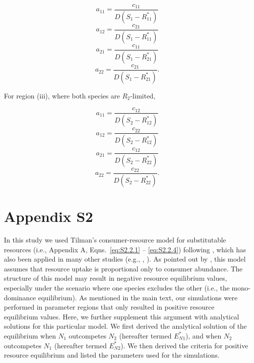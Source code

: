 \begin{equation}
a_{11}=\frac{c_{11}}{D\left ( S_{1}-R_{11}^{*} \right )}
\tag{S2.17.1}\label{eq:S2.17.1}
\end{equation} 
\begin{equation}
a_{12}=\frac{c_{21}}{D\left ( S_{1}-R_{11}^{*} \right )}
\tag{S2.17.2}\label{eq:S2.17.2} 
\end{equation}
\begin{equation}
a_{21}=\frac{c_{11}}{D\left ( S_{1}-R_{21}^{*} \right )}
\tag{S2.17.3}\label{eq:S2.17.3}
\end{equation}
\begin{equation}
a_{22}=\frac{c_{21}}{D\left ( S_{1}-R_{21}^{*} \right )}.
\tag{S2.17.4}\label{eq:S2.17.4}
\end{equation}

\noindent For region (iii), where both species are $R_{2}$-limited, 

\begin{equation}
a_{11}=\frac{c_{12}}{D\left ( S_{2}-R_{12}^{*} \right )}
\tag{S2.18.1}\label{eq:S2.18.1}
\end{equation}
\begin{equation}
a_{12}=\frac{c_{22}}{D\left ( S_{2}-R_{12}^{*} \right )}
\tag{S2.18.2}\label{eq:S2.18.2}
\end{equation}
\begin{equation}
a_{21}=\frac{c_{12}}{D\left ( S_{2}-R_{22}^{*} \right )}
\tag{S2.18.3}\label{eq:S2.18.3}
\end{equation}
\begin{equation}
a_{22}=\frac{c_{22}}{D\left ( S_{2}-R_{22}^{*} \right )}.
\tag{S2.18.4}\label{eq:S2.18.4}
\end{equation}



\section{Appendix S2}
In this study we used Tilman's consumer-resource model for substitutable resources (i.e., Appendix A, Eqns.~\ref{eq:S2.2.1} -- \ref{eq:S2.2.4}) following \cite[p.~270]{tilman1982}, which has also been applied in many other studies (e.g., \cite{Meszenaz2006}, \cite{Barabas2014}). As pointed out by \cite{Kleinhesselink2015}, this model assumes that resource uptake is proportional only to consumer abundance. The structure of this model may result in negative resource equilibrium values, especially under the scenario where one species excludes the other (i.e., the mono-dominance equilibrium). As mentioned in the main text, our simulations were performed in parameter regions that only resulted in positive resource equilibrium values. Here, we further supplement this argument with analytical solutions for this particular model. We first derived the analytical solution of the equilibrium when $N_1$ outcompetes $N_2$ (hereafter termed \textbf{$E_{N1}^{*}$}), and when $N_2$ outcompetes $N_1$ (hereafter termed \textbf{$E_{N2}^{*}$}). We then derived the criteria for positive resource equilibrium and listed the parameters used for the simulations. 
\par


